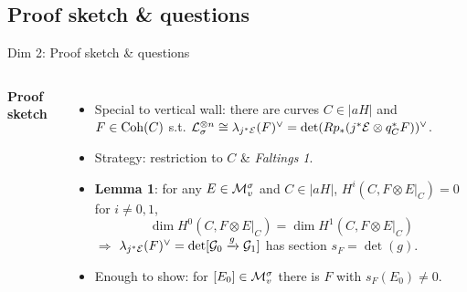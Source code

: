 \documentclass[8pt]{beamer} %
\begin{document}
\subsection{Proof sketch \& questions}
\begin{frame}[fragile]{Dim 2: Proof sketch \& questions}
    \begin{columns}[t]
        \textbf{Proof sketch}
        \begin{itemize}
            \item<2-> Special to vertical wall: there are curves $C \in |a H|$ and $F \in \mathrm{Coh}(C)$ s.t. $\mathcal{L}_\sigma^{\otimes n} \cong \lambda_{j^* \mathcal{E}}(F)^\vee = \det(R p_*(j^*\mathcal{E} \otimes q_C^*F))^\vee$.
            \item<3-> Strategy: restriction to $C$ \& \textit{Faltings 1}.
            \item<4-> \textbf{Lemma 1}: for any $E \in \mathcal{M}^\sigma_v$ and $C \in |a H|$,
            $H^i(C, F \otimes E|_C) = 0$ for $i \neq 0, 1$,
            \[ \dim H^0(C, F \otimes E|_C) = \dim H^1(C, F \otimes E|_C) \]
            $\Rightarrow$ $\lambda_{j^*\mathcal{E}}(F)^\vee = \det[\mathcal{G}_0 \xrightarrow{g} \mathcal{G}_1]$ has section $s_F = \det(g)$.
            \item<5-> %
            Enough to show: for $[E_0] \in \mathcal{M}^\sigma_v$ there is $F$ with $s_F(E_0) \neq 0$.
        \end{itemize}
        

\end{columns}
\end{frame}
\end{document}
